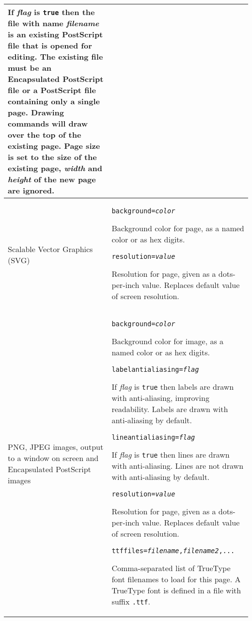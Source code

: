 \begin{longtable}{|p{4cm}|p{10cm}|}
If \textit{flag} is \texttt{true} then the file with name
\textit{filename} is an existing PostScript 
file that is opened for editing.  The existing file must be an
Encapsulated PostScript file or a PostScript file containing only
a single page.
Drawing commands will draw over the top of the existing page.
Page size is set to the size of the existing page,
\textit{width} and \textit{height} of the new page are ignored.  \\

\hline

Scalable Vector Graphics (SVG) &

\texttt{background=\textit{color}}

Background color for page, as a named color or as hex digits.

\vspace{10pt}
\texttt{resolution=\textit{value}}

Resolution for page, given as a dots-per-inch value.  Replaces
default value of screen resolution. \\

\hline

PNG, JPEG images, output to a window on screen
and Encapsulated PostScript images &

\texttt{background=\textit{color}}

Background color for image, as a named color or as hex digits.

\vspace{10pt}
\texttt{labelantialiasing=\textit{flag}}

If \textit{flag} is \texttt{true} then
labels are drawn with anti-aliasing, improving readability.
Labels are drawn with anti-aliasing by default.

\vspace{10pt}
\texttt{lineantialiasing=\textit{flag}}

If \textit{flag} is \texttt{true} then
lines are drawn with anti-aliasing.
Lines are not drawn with anti-aliasing by default.

\vspace{10pt}
\texttt{resolution=\textit{value}}

Resolution for page, given as a dots-per-inch value.  Replaces
default value of screen resolution.

\vspace{10pt}
\texttt{ttffiles=\textit{filename},\textit{filename2},...}

Comma-separated list of TrueType font filenames
to load for this page.
A TrueType font is defined in a file
with suffix \texttt{.ttf}.


\end{longtable}
